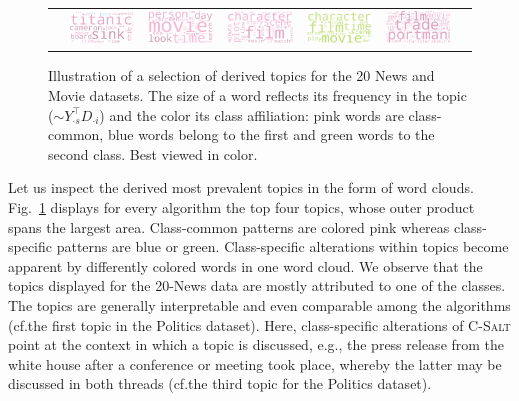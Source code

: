 \begin{figure}[!t]
\begin{tabular}{ccc@{\hskip 0.1in}cc@{\hskip 0.1in}cc}
    & \includegraphics[width=0.14\columnwidth]{pics/Wordclouds/MoviePunk_3}
    &  \includegraphics[width=0.14\columnwidth]{pics/Wordclouds/MoviePrimp_3}
    & \includegraphics[width=0.14\columnwidth]{pics/Wordclouds/MoviePrimp_4}
    &  \includegraphics[width=0.14\columnwidth]{pics/Wordclouds/MovieDBSSL_3}
    &  \includegraphics[width=0.14\columnwidth]{pics/Wordclouds/MovieDBSSL_4}
  \end{tabular}
  \caption{Illustration of a selection of derived topics for the 20 News and Movie datasets. The size of a word reflects its frequency in the topic ($\sim Y_{\cdot s}^\top D_{\cdot i}$) and the color its class affiliation: pink words are class-common, blue words belong to the first and green words to the second class. Best viewed in color.\label{fig:topics}}
\end{figure}
Let us inspect the derived most prevalent topics in the form of word clouds.
Fig.~\ref{fig:topics} displays for every algorithm the top four topics, whose outer product spans the largest area. Class-common patterns are colored pink whereas class-specific patterns are blue or green. Class-specific alterations within topics become apparent by differently colored words in one word cloud. We observe that the topics displayed for the 20-News data are mostly attributed to one of the classes. The topics are generally interpretable and even comparable among the algorithms (cf.\@ the first topic in the Politics dataset). Here, class-specific alterations of \textsc{C-Salt} point at the context in which a topic is discussed, e.g., the press release from the white house after a conference or meeting took place, whereby the latter may be discussed in both threads (cf.\@ the third topic for the Politics dataset).

